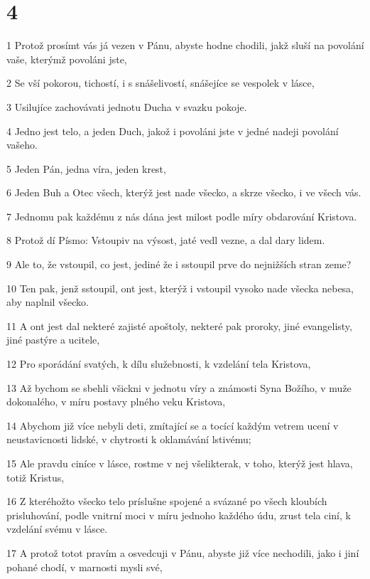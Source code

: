 \chapter{4}

\par 1 Protož prosímt vás já vezen v Pánu, abyste hodne chodili, jakž sluší na povolání vaše, kterýmž povoláni jste,
\par 2 Se vší pokorou, tichostí, i s snášelivostí, snášejíce se vespolek v lásce,
\par 3 Usilujíce zachovávati jednotu Ducha v svazku pokoje.
\par 4 Jedno jest telo, a jeden Duch, jakož i povoláni jste v jedné nadeji povolání vašeho.
\par 5 Jeden Pán, jedna víra, jeden krest,
\par 6 Jeden Buh a Otec všech, kterýž jest nade všecko, a skrze všecko, i ve všech vás.
\par 7 Jednomu pak každému z nás dána jest milost podle míry obdarování Kristova.
\par 8 Protož dí Písmo: Vstoupiv na výsost, jaté vedl vezne, a dal dary lidem.
\par 9 Ale to, že vstoupil, co jest, jediné že i sstoupil prve do nejnižších stran zeme?
\par 10 Ten pak, jenž sstoupil, ont jest, kterýž i vstoupil vysoko nade všecka nebesa, aby naplnil všecko.
\par 11 A ont jest dal nekteré zajisté apoštoly, nekteré pak proroky, jiné evangelisty, jiné pastýre a ucitele,
\par 12 Pro sporádání svatých, k dílu služebnosti, k vzdelání tela Kristova,
\par 13 Až bychom se sbehli všickni v jednotu víry a známosti Syna Božího, v muže dokonalého, v míru postavy plného veku Kristova,
\par 14 Abychom již více nebyli deti, zmítající se a tocící každým vetrem ucení v neustavicnosti lidské, v chytrosti k oklamávání lstivému;
\par 15 Ale pravdu ciníce v lásce, rostme v nej všelikterak, v toho, kterýž jest hlava, totiž Kristus,
\par 16 Z kteréhožto všecko telo príslušne spojené a svázané po všech kloubích prisluhování, podle vnitrní moci v míru jednoho každého údu, zrust tela ciní, k vzdelání svému v lásce.
\par 17 A protož totot pravím a osvedcuji v Pánu, abyste již více nechodili, jako i jiní pohané chodí, v marnosti mysli své,
